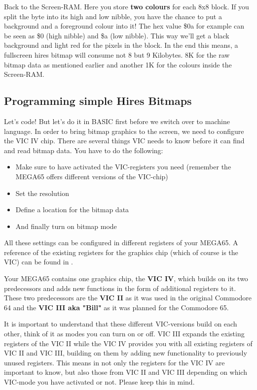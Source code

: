 Back to the Screen-RAM. Here you store \textbf{two colours} for each 8x8 block. If you split the byte into its high and low nibble, you have the chance to put a background and a foreground colour into it! The hex value \$0a for example can be seen as \$0 (high nibble) and \$a (low nibble). This way we'll get a black background and light red for the pixels in the block. In the end this means, a fullscreen hires bitmap will consume not 8 but 9 Kilobytes. 8K for the raw bitmap data as mentioned earlier and another 1K for the colours inside the Screen-RAM.\\

\subsection*{Programming simple Hires Bitmaps}

Let's code! But let's do it in BASIC first before we switch over to machine language. In order to bring bitmap graphics to the screen, we need to configure the VIC IV chip. There are several things VIC needs to know before it can find and read bitmap data. You have to do the following:

\begin{itemize}
	\item Make sure to have activated the VIC-registers you need (remember the MEGA65 offers different versions of the VIC-chip)
	\item Set the resolution
	\item Define a location for the bitmap data
	\item And finally turn on bitmap mode
\end{itemize}

All these settings can be configured in different registers of your MEGA65. A reference of the existing registers for the graphics chip (which of course is the VIC) can be found in .

Your MEGA65 contains one graphics chip, the \textbf{VIC IV}, which builds on its two predecessors and adds new functions in the form of additional registers to it. These two predecessors are the \textbf{VIC II} as it was used in the original Commodore 64 and the \textbf{VIC III aka "Bill"} as it was planned for the Commodore 65.

It is important to understand that these different VIC-versions build on each other, think of it as modes you can turn on or off.
VIC III expands the existing registers of the VIC II while the VIC IV provides you with all existing registers of VIC II and VIC III, building on them by adding new functionality to previously unused registers. This means in  not only the registers for the VIC IV are important to know, but also those from VIC II and VIC III depending on which VIC-mode you have activated or not. Please keep this in mind.

